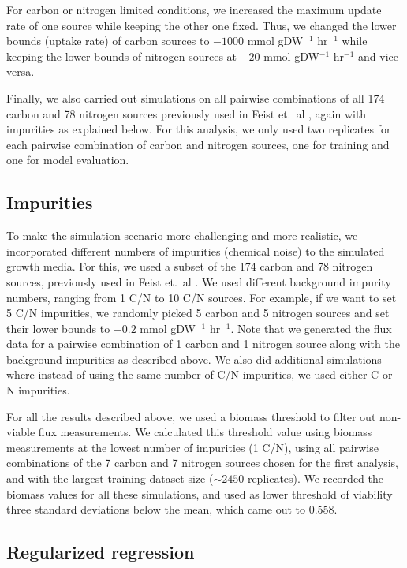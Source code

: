 \documentclass[12pt]{article}
\begin{document}
For carbon or nitrogen limited conditions, we increased the maximum update rate of one source while keeping the other one fixed. Thus, we changed the lower bounds (uptake rate) of carbon sources to $-1000$ mmol gDW$^{-1}$ hr$^{-1}$ while keeping the lower bounds of nitrogen sources at $-20$ mmol gDW$^{-1}$ hr$^{-1}$ and vice versa. 

Finally, we also carried out simulations on all pairwise combinations of all 174 carbon and 78 nitrogen sources previously used in Feist et.\ al \cite{Feistetal2007}, again with impurities as explained below. For this analysis, we only used two replicates for each pairwise combination of carbon and nitrogen sources, one for training and one for model evaluation.

\subsection{Impurities}
To make the simulation scenario more challenging and more realistic, we incorporated different numbers of impurities (chemical noise) to the simulated growth media. For this, we used a subset of the 174 carbon and 78 nitrogen sources, previously used in Feist et.\ al \cite{Feistetal2007}.  We used different background impurity numbers, ranging from 1 C/N to 10 C/N sources. For example, if we want to set 5 C/N impurities, we randomly picked 5 carbon and 5 nitrogen sources and set their lower bounds to $-0.2$ mmol gDW$^{-1}$ hr$^{-1}$. Note that we generated the flux data for a pairwise combination of 1 carbon and 1 nitrogen source along with the background impurities as described above. We also did additional simulations where instead of using the same number of C/N impurities, we used either C or N impurities.

For all the results described above, we used a biomass threshold to filter out non-viable flux measurements. We calculated this threshold value using biomass measurements at the lowest number of impurities (1 C/N), using all pairwise combinations of the 7 carbon and 7 nitrogen sources chosen for the first analysis, and with the largest training dataset size ($\sim2450$ replicates). We recorded the biomass values for all these simulations, and used as lower threshold of viability three standard deviations below the mean, which came out to 0.558.

\subsection{Regularized regression}
\end{document}
